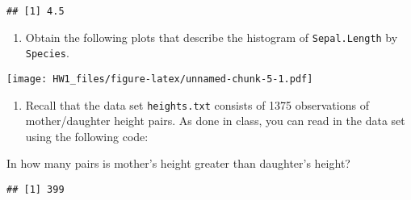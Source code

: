 \documentclass[]{article}
\providecommand{\tightlist}{%
  \setlength{\itemsep}{0pt}\setlength{\parskip}{0pt}}
\begin{document}
\begin{verbatim}
## [1] 4.5
\end{verbatim}

\begin{enumerate}
\def\labelenumi{\arabic{enumi}.}
\setcounter{enumi}{3}
\tightlist
\item
  Obtain the following plots that describe the histogram of
  \texttt{Sepal.Length} by \texttt{Species}.
\end{enumerate}

\texttt{[image: HW1\_files/figure-latex/unnamed-chunk-5-1.pdf]}

\begin{enumerate}
\def\labelenumi{\arabic{enumi}.}
\setcounter{enumi}{4}
\tightlist
\item
  Recall that the data set \texttt{heights.txt} consists of 1375
  observations of mother/daughter height pairs. As done in class, you
  can read in the data set using the following code:
\end{enumerate}

In how many pairs is mother's height greater than daughter's height?

\begin{verbatim}
## [1] 399
\end{verbatim}
\end{document}
